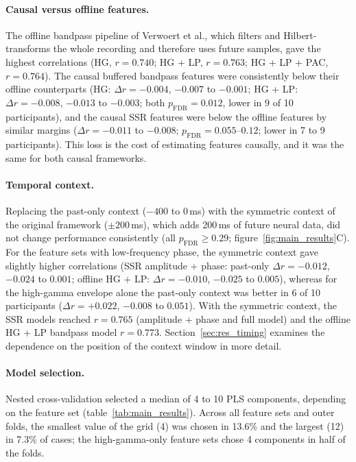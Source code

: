 \documentclass{iopjournal}
\begin{document}
\paragraph{Causal versus offline features.} The offline bandpass pipeline of Verwoert et al., which filters and Hilbert-transforms the whole recording and therefore uses future samples, gave the highest correlations (HG, $r=0.740$; HG + LP, $r=0.763$; HG + LP + PAC, $r=0.764$). The causal buffered bandpass features were consistently below their offline counterparts (HG: $\Delta r=-0.004$, $-0.007$ to $-0.001$; HG + LP: $\Delta r=-0.008$, $-0.013$ to $-0.003$; both $p_{\mathrm{FDR}}=0.012$, lower in 9 of 10 participants), and the causal SSR features were below the offline features by similar margins ($\Delta r=-0.011$ to $-0.008$; $p_{\mathrm{FDR}}=0.055$--$0.12$; lower in 7 to 9 participants). This loss is the cost of estimating features causally, and it was the same for both causal frameworks.

\paragraph{Temporal context.} Replacing the past-only context ($-400$ to $0$\,ms) with the symmetric context of the original framework ($\pm200$\,ms), which adds 200\,ms of future neural data, did not change performance consistently (all $p_{\mathrm{FDR}}\ge0.29$; figure~\ref{fig:main_results}C). For the feature sets with low-frequency phase, the symmetric context gave slightly higher correlations (SSR amplitude + phase: past-only $\Delta r=-0.012$, $-0.024$ to $0.001$; offline HG + LP: $\Delta r=-0.010$, $-0.025$ to $0.005$), whereas for the high-gamma envelope alone the past-only context was better in 6 of 10 participants ($\Delta r=+0.022$, $-0.008$ to $0.051$). With the symmetric context, the SSR models reached $r=0.765$ (amplitude + phase and full model) and the offline HG + LP bandpass model $r=0.773$. Section~\ref{sec:res_timing} examines the dependence on the position of the context window in more detail.

\paragraph{Model selection.} Nested cross-validation selected a median of 4 to 10 PLS components, depending on the feature set (table~\ref{tab:main_results}). Across all feature sets and outer folds, the smallest value of the grid (4) was chosen in 13.6\% and the largest (12) in 7.3\% of cases; the high-gamma-only feature sets chose 4 components in half of the folds.
\end{document}
